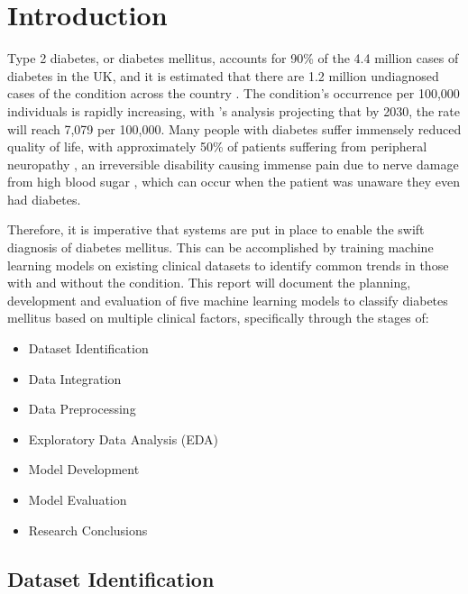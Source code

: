\documentclass[12pt]{report}
\newcommand{\para}{\vspace{8pt}\noindent}
\begin{document}
\chapter{Introduction}

Type 2 diabetes, or diabetes mellitus, accounts for 90\% of the 4.4 million cases of diabetes in the UK, and it is estimated that 
there are 1.2 million undiagnosed cases of the condition across the country \autocite{diabetes_uk_how_nodate}. The condition's 
occurrence per 100,000 individuals is rapidly increasing, with \textcite{khan_epidemiology_2020}'s analysis projecting that by 
2030, the rate will reach 7,079 per 100,000. Many people with diabetes suffer immensely reduced quality of life, with approximately 50\% 
of patients suffering from peripheral neuropathy \autocite{dhanapalaratnam_effect_2024}, an irreversible disability causing immense pain due 
to nerve damage from high blood sugar \autocite{nhs_peripheral_2022}, which can occur when the patient was unaware they even 
had diabetes. 

\para
Therefore, it is imperative that systems are put in place to enable the swift diagnosis of diabetes mellitus. 
This can be accomplished by training machine learning models on existing clinical datasets 
to identify common trends in those with and without the condition. This report will document the planning, development 
and evaluation of five machine learning models to classify diabetes mellitus based on multiple clinical factors, specifically through the stages of:

\begin{itemize}
    \item Dataset Identification
    \item Data Integration
    \item Data Preprocessing
    \item Exploratory Data Analysis (EDA)
    \item Model Development 
    \item Model Evaluation
    \item Research Conclusions
\end{itemize}

\pagebreak 
\section{Dataset Identification}
\end{document}
